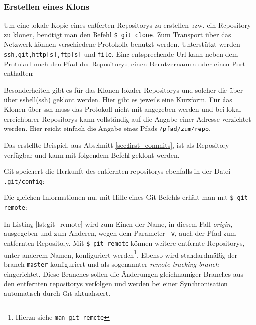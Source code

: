 \subsubsection{Erstellen eines Klons}\label{sec:gitclone}
Um eine lokale Kopie eines entferten Repositorys zu erstellen bzw. ein
Repository zu klonen, benötigt man den Befehl \texttt{\$ git clone}. Zum
Transport über das Netzwerk können verschiedene Protokolle benutzt werden.
Unterstützt werden \texttt{ssh,git,http[s],ftp[s]} und \texttt{file}. Eine
entsprechende Url kann neben dem Protokoll noch den Pfad des Repositorys, einen
Benutzernamen oder einen Port enthalten:



Besonderheiten gibt es für das Klonen lokaler Repositorys und solcher die über
über \gls{sshell}(\acrshort{ssh}) geklont werden. Hier gibt es jeweils eine
Kurzform. Für das Klonen über \acrshort{ssh} muss das Protokoll nicht mit
angegeben werden und bei lokal erreichbarer Repositorys kann vollständig auf
die Angabe einer Adresse verzichtet werden. Hier reicht einfach die Angabe
eines Pfads \texttt{/pfad/zum/repo}.

Das erstellte Beispiel, aus Abschnitt \ref{sec:first_commits}, ist als
Repository verfügbar und kann mit folgendem Befehl geklont werden.



Git speichert die Herkunft des entfernten \glspl{repository} ebenfalls in der
Datei \texttt{.git/config}:



Die gleichen Informationen nur mit Hilfe eines Git Befehls erhält man mit
\texttt{\$ git remote}:



In Listing \ref{lst:git_remote} wird zum Einen der Name, in diesem Fall
\textit{origin}, ausgegeben und zum Anderen, wegen dem Parameter \texttt{-v},
auch der Pfad zum entfernten Repository. Mit \texttt{\$ git remote} können
weitere entfernte Repositorys, unter anderem Namen, konfiguriert
werden\footnote{Hierzu siehe \texttt{man git remote}}. Ebenso wird
standardmäßig der \gls{branch} \texttt{master} konfiguriert und als sogenannter
\textit{remote-tracking-branch} eingerichtet. Diese Branches sollen die
Änderungen gleichnamiger Branches aus den entfernten \glspl{repository}
verfolgen und werden bei einer Synchronisation automatisch durch Git
aktualisiert.\cite[S.~141-143]{gitosp}


